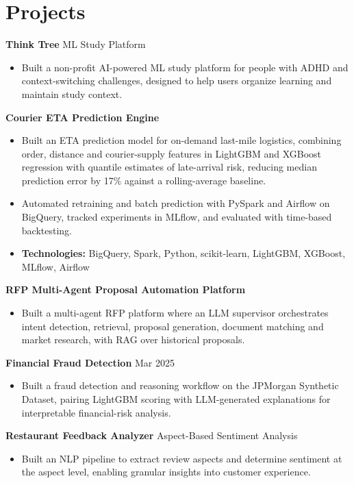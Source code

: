\documentclass[10pt,a4paper]{article}
\begin{document}
\section{Projects}
\textbf{Think Tree} \textbar{} ML Study Platform\par
\begin{itemize}
  \item Built a non-profit AI-powered ML study platform for people with ADHD and context-switching challenges, designed to help users organize learning and maintain study context.
\end{itemize}
\textbf{Courier ETA Prediction Engine}\par
\begin{itemize}
  \item Built an ETA prediction model for on-demand last-mile logistics, combining order, distance and courier-supply features in LightGBM and XGBoost regression with quantile estimates of late-arrival risk, reducing median prediction error by 17\% against a rolling-average baseline.
  \item Automated retraining and batch prediction with PySpark and Airflow on BigQuery, tracked experiments in MLflow, and evaluated with time-based backtesting.
  \item \textbf{Technologies:} BigQuery, Spark, Python, scikit-learn, LightGBM, XGBoost, MLflow, Airflow
\end{itemize}
\textbf{RFP Multi-Agent Proposal Automation Platform}\par
\begin{itemize}
  \item Built a multi-agent RFP platform where an LLM supervisor orchestrates intent detection, retrieval, proposal generation, document matching and market research, with RAG over historical proposals.
\end{itemize}
\textbf{Financial Fraud Detection} \textbar{} Mar 2025\par
\begin{itemize}
  \item Built a fraud detection and reasoning workflow on the JPMorgan Synthetic Dataset, pairing LightGBM scoring with LLM-generated explanations for interpretable financial-risk analysis.
\end{itemize}
\textbf{Restaurant Feedback Analyzer} \textbar{} Aspect-Based Sentiment Analysis\par
\begin{itemize}
  \item Built an NLP pipeline to extract review aspects and determine sentiment at the aspect level, enabling granular insights into customer experience.
\end{itemize}
\end{document}
